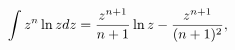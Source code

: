 \[\int z^{n}\mathop{\ln\/}\nolimits zdz=\frac{z^{n+1}}{n+1}\mathop{\ln\/}%
\nolimits z-\frac{z^{n+1}}{(n+1)^{2}},\]